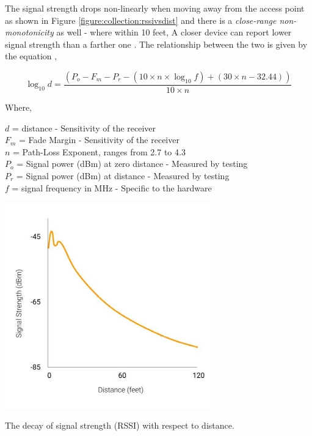 The signal strength drops non-linearly when moving away from the access point as shown in Figure \ref{figure:collection:rssivsdist} and there is a \textit{close-range non-monotonicity} as well - where within 10 feet, A closer device can report lower signal strength than a farther one \citep{cisco2008}.
The relationship between the two is given by the equation \cite{rssieq},

\begin{equation}
  \log_{10}{d} = \frac{(P_o - F_m - P_r - (10 \times n \times \log_{10}{f}) + ( 30 \times n - 32.44))}{10\times n}
  \label{equation:rssi:hard}
\end{equation}

Where,

\noindent
\(d\) = distance - Sensitivity of the receiver \\
\(F_m\) = Fade Margin - Sensitivity of the receiver \\
\(n\) = Path-Loss Exponent, ranges from 2.7 to 4.3 \\
\(P_o\) = Signal power (dBm) at zero distance - Measured by testing \\
\(P_r\) = Signal power (dBm) at distance - Measured by testing \\
\(f\) = signal frequency in MHz - Specific to the hardware \\

\vspace{1em}

\begin{marginfigure}
  \forceversofloat
  \includegraphics{images/rssi-vs-dist.jpeg}
  \caption{The decay of signal strength (RSSI) with respect to distance.}
  \label{figure:collection:rssivsdist}
\end{marginfigure}

